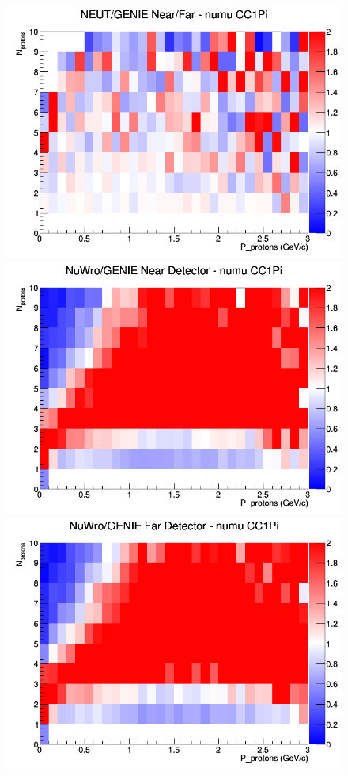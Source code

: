 \begin{figure}[h]
\endminipage
{}
\includegraphics[width=\linewidth]{N_P/nominal/protons/ratios/CC1Pi_NEUT_GENIE_numu_NF_N_P.png}
\endminipage
\newline
{}
\includegraphics[width=\linewidth]{N_P/nominal/protons/ratios/CC1Pi_NuWro_GENIE_numu_near_N_P.png}
\endminipage
{}
\includegraphics[width=\linewidth]{N_P/nominal/protons/ratios/CC1Pi_NuWro_GENIE_numu_far_N_P.png}

\end{figure}
